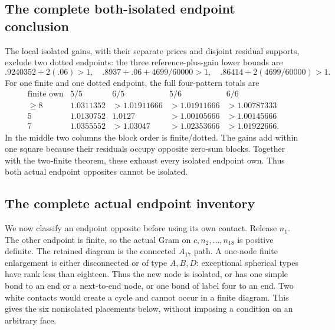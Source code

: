 \documentclass[11pt]{article}
\theoremstyle{definition}
\theoremstyle{remark}
\begin{document}
\subsection{The complete both-isolated endpoint conclusion}
The local isolated gains, with their separate
prices and disjoint residual supports, exclude
two dotted endpoints:
the three reference-plus-gain lower bounds are
\[
 .9240352+2(.06)>1,\quad
 .8937+.06+4699/60000>1,\quad
 .86414+2(4699/60000)>1.
\]
For one finite and one dotted endpoint, the
full four-pattern totals are
\[
\begin{array}{c|c|c|c|c}
\text{finite own}&5/5&6/5&5/6&6/6\\ \hline
\geq8&1.0311352&>1.01911666&>1.01911666&>1.00787333\\
5&1.0130752&1.0127&>1.00105666&>1.00145666\\
7&1.0355552&>1.03047&>1.02353666&>1.01922666.
\end{array}
\]
In the middle two columns the block order
is finite/dotted. The gains add within
one square because their residuals occupy
opposite zero-sum blocks.
Together with the two-finite theorem,
these exhaust every isolated endpoint own.
Thus both actual endpoint opposites cannot
be isolated.

\subsection{The complete actual endpoint inventory}
\label{app:A18endpointinventory}
We now classify an endpoint opposite before using its own contact.
Release \(n_1\). The other endpoint is finite, so the actual Gram on
\(c,n_2,\ldots,n_{18}\) is positive definite. The retained diagram is
the connected \(A_{17}\) path. A one-node finite enlargement is either
disconnected or of type \(A,B,D\): exceptional spherical types have
rank less than eighteen. Thus the new node is isolated, or has one
simple bond to an end or a next-to-end node, or one bond of label four
to an end. Two white contacts would create a cycle and cannot occur
in a finite diagram. This gives the six nonisolated placements below,
without imposing a condition on an arbitrary face.
\end{document}
